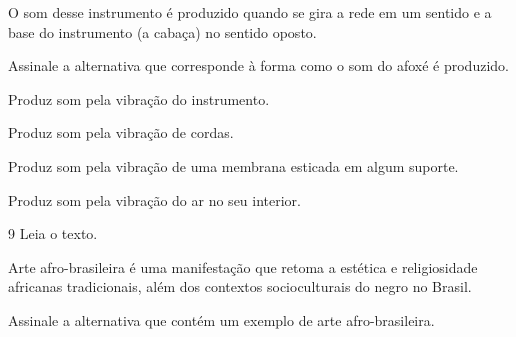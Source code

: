 O som desse instrumento é
produzido quando se gira a rede em um sentido e a base do instrumento (a
cabaça) no sentido oposto.

Assinale a alternativa que corresponde à forma como o som do afoxé é
produzido.

\begin{escolha}
\item
  Produz som pela vibração do instrumento.
\item
  Produz som pela vibração de cordas.
\item
  Produz som pela vibração de uma membrana esticada em algum suporte.
\item
  Produz som pela vibração do ar no seu interior.
\end{escolha}


\num{9}  Leia o texto.

Arte afro-brasileira é uma manifestação que retoma a estética e religiosidade africanas tradicionais, além dos contextos socioculturais do negro no Brasil.

Assinale a alternativa que contém um exemplo de arte afro-brasileira.

%
%
%
%
%
%
%
%
%
%

